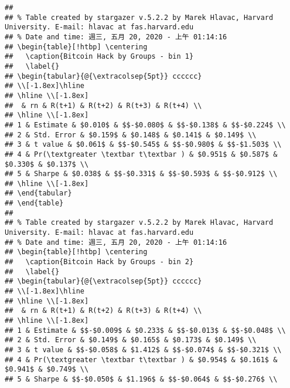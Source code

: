 \documentclass[
]{article}
\begin{document}
\begin{verbatim}
## 
## % Table created by stargazer v.5.2.2 by Marek Hlavac, Harvard University. E-mail: hlavac at fas.harvard.edu
## % Date and time: 週三, 五月 20, 2020 - 上午 01:14:16
## \begin{table}[!htbp] \centering 
##   \caption{Bitcoin Hack by Groups - bin 1} 
##   \label{} 
## \begin{tabular}{@{\extracolsep{5pt}} cccccc} 
## \\[-1.8ex]\hline 
## \hline \\[-1.8ex] 
##  & rn & R(t+1) & R(t+2) & R(t+3) & R(t+4) \\ 
## \hline \\[-1.8ex] 
## 1 & Estimate & $0.010$ & $$-$0.080$ & $$-$0.138$ & $$-$0.224$ \\ 
## 2 & Std. Error & $0.159$ & $0.148$ & $0.141$ & $0.149$ \\ 
## 3 & t value & $0.061$ & $$-$0.545$ & $$-$0.980$ & $$-$1.503$ \\ 
## 4 & Pr(\textgreater \textbar t\textbar ) & $0.951$ & $0.587$ & $0.330$ & $0.137$ \\ 
## 5 & Sharpe & $0.038$ & $$-$0.331$ & $$-$0.593$ & $$-$0.912$ \\ 
## \hline \\[-1.8ex] 
## \end{tabular} 
## \end{table} 
## 
## % Table created by stargazer v.5.2.2 by Marek Hlavac, Harvard University. E-mail: hlavac at fas.harvard.edu
## % Date and time: 週三, 五月 20, 2020 - 上午 01:14:16
## \begin{table}[!htbp] \centering 
##   \caption{Bitcoin Hack by Groups - bin 2} 
##   \label{} 
## \begin{tabular}{@{\extracolsep{5pt}} cccccc} 
## \\[-1.8ex]\hline 
## \hline \\[-1.8ex] 
##  & rn & R(t+1) & R(t+2) & R(t+3) & R(t+4) \\ 
## \hline \\[-1.8ex] 
## 1 & Estimate & $$-$0.009$ & $0.233$ & $$-$0.013$ & $$-$0.048$ \\ 
## 2 & Std. Error & $0.149$ & $0.165$ & $0.173$ & $0.149$ \\ 
## 3 & t value & $$-$0.058$ & $1.412$ & $$-$0.074$ & $$-$0.321$ \\ 
## 4 & Pr(\textgreater \textbar t\textbar ) & $0.954$ & $0.161$ & $0.941$ & $0.749$ \\ 
## 5 & Sharpe & $$-$0.050$ & $1.196$ & $$-$0.064$ & $$-$0.276$ \\ 

\end{verbatim}
\end{document}
